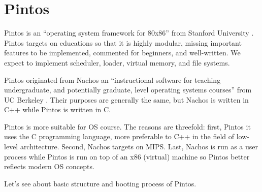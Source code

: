 \documentclass[a4paper,article,11pt,oneside]{article}
\begin{document}
\section{Pintos}\label{secpintos}
Pintos is an ``operating system framework for 80x86'' from Stanford
University \cite{pintos}. Pintos targets on educations so that it is
highly modular, missing important features to be implemented,
commented for beginners, and well-written. We expect to implement
scheduler, loader, virtual memory, and file systems.

Pintos originated from Nachos an ``instructional software for teaching
undergraduate, and potentially graduate, level operating systems
courses'' from UC Berkeley \cite{nachos}. Their purposes are generally
the same, but Nachos is written in C++ while Pintos is written in C.

Pintos is more suitable for OS course. The reasons are threefold:
first, Pintos it uses the C programming language, more preferable to
C++ in the field of low-level architecture. Second, Nachos targets on
MIPS. Last, Nachos is run as a user process while Pintos is run on top
of an x86 (virtual) machine so Pintos better reflects modern OS
concepts.

Let's see about basic structure and booting process of Pintos.
\end{document}
